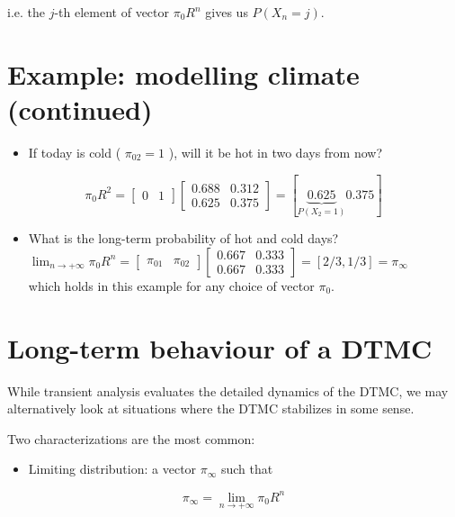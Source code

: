 \documentclass[10pt]{article}
\begin{document}
i.e. the $j$-th element of vector $\pi_{0} R^{n}$ gives us $P\left(X_{n}=j\right)$.

\section*{Example: modelling climate (continued)}
\begin{itemize}
  \item If today is cold ( $\pi_{02}=1$ ), will it be hot in two days from now?
\end{itemize}

$$
\pi_{0} R^{2}=\left[\begin{array}{ll}
0 & 1
\end{array}\right]\left[\begin{array}{ll}
0.688 & 0.312 \\
0.625 & 0.375
\end{array}\right]=[\underbrace{0.625}_{P\left(X_{2}=1\right)} 0.375]
$$

\begin{itemize}
  \item What is the long-term probability of hot and cold days?\\
$\lim _{n \rightarrow+\infty} \pi_{0} R^{n}=\left[\begin{array}{ll}\pi_{01} & \pi_{02}\end{array}\right]\left[\begin{array}{ll}0.667 & 0.333 \\ 0.667 & 0.333\end{array}\right]=[2 / 3,1 / 3]=\pi_{\infty}$\\
which holds in this example for any choice of vector $\pi_{0}$.
\end{itemize}

\section*{Long-term behaviour of a DTMC}
While transient analysis evaluates the detailed dynamics of the DTMC, we may alternatively look at situations where the DTMC stabilizes in some sense.

Two characterizations are the most common:

\begin{itemize}
  \item Limiting distribution: a vector $\pi_{\infty}$ such that
\end{itemize}

$$
\pi_{\infty}=\lim _{n \rightarrow+\infty} \pi_{0} R^{n}
$$
\end{document}
